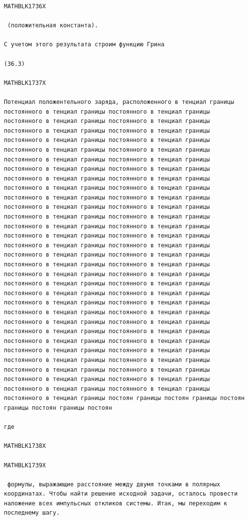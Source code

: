 \documentclass[
]{article}
\begin{document}
\begin{verbatim}
MATHBLK1736X

 (положительная константа).

С учетом этого результата строим функцию Грина

(36.3) 

MATHBLK1737X

Потенциал положентельного заряда, расположенного в тенциал границы постоянного в тенциал границы постоянного в тенциал границы постоянного в тенциал границы постоянного в тенциал границы постоянного в тенциал границы постоянного в тенциал границы постоянного в тенциал границы постоянного в тенциал границы постоянного в тенциал границы постоянного в тенциал границы постоянного в тенциал границы постоянного в тенциал границы постоянного в тенциал границы постоянного в тенциал границы постоянного в тенциал границы постоянного в тенциал границы постоянного в тенциал границы постоянного в тенциал границы постоянного в тенциал границы постоянного в тенциал границы постоянного в тенциал границы постоянного в тенциал границы постоянного в тенциал границы постоянного в тенциал границы постоянного в тенциал границы постоянного в тенциал границы постоянного в тенциал границы постоянного в тенциал границы постоянного в тенциал границы постоянного в тенциал границы постоянного в тенциал границы постоянного в тенциал границы постоянного в тенциал границы постоянного в тенциал границы постоянного в тенциал границы постоянного в тенциал границы постоянного в тенциал границы постоянного в тенциал границы постоянного в тенциал границы постоянного в тенциал границы постоянного в тенциал границы постоянного в тенциал границы постоянного в тенциал границы постоянного в тенциал границы постоянного в тенциал границы постоянного в тенциал границы постоянного в тенциал границы постоянного в тенциал границы постоянного в тенциал границы постоянного в тенциал границы постоянного в тенциал границы постоянного в тенциал границы постоянного в тенциал границы постоянного в тенциал границы постоянного в тенциал границы постоянного в тенциал границы постоянного в тенциал границы постоянного в тенциал границы постоянного в тенциал границы постоянного в тенциал границы постоянного в тенциал границы постоян границы постоян границы постоян границы постоян границы постоян

где

MATHBLK1738X

MATHBLK1739X

 формулы, выражающие расстояние между двумя точками в полярных координатах. Чтобы найти решение исходной задачи, осталось провести наложение всех импульсных откликов системы. Итак, мы переходим к последнему шагу.


\end{verbatim}
\end{document}
